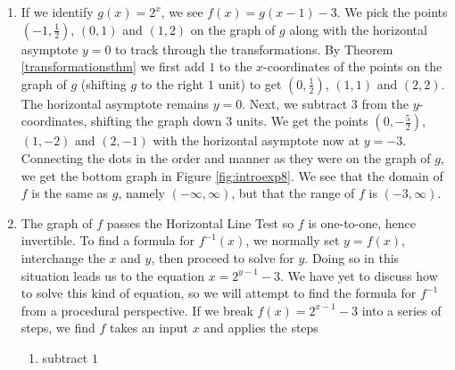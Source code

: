 {
\begin{enumerate}

\item  If we identify $g(x) = 2^{x}$, we see $f(x) = g(x-1)-3$.  We pick the points $\left(-1, \frac{1}{2}\right)$, $(0,1)$ and $(1, 2)$ on the graph of $g$ along with the horizontal asymptote $y=0$ to track through the transformations. By Theorem \ref{transformationsthm} we first add $1$ to the $x$-coordinates of the points on the graph of $g$ (shifting $g$ to the right $1$ unit) to get $\left(0, \frac{1}{2}\right)$, $(1,1)$ and $(2, 2)$.  The horizontal asymptote remains $y=0$.  Next, we subtract $3$ from the $y$-coordinates, shifting the graph down $3$ units.  We get the points $\left(0, -\frac{5}{2}\right)$, $(1,-2)$ and $(2, -1)$ with the horizontal asymptote now at $y=-3$.  Connecting the dots in the order and manner as they were on the graph of $g$, we get the bottom graph in Figure \ref{fig:introexp8}.  We see that the domain of $f$ is the same as $g$, namely $(-\infty, \infty)$, but that the range of $f$ is $(-3, \infty)$.



\item  The graph of $f$ passes the Horizontal Line Test so $f$ is one-to-one, hence invertible.  To find a formula for $f^{-1}(x)$, we normally set $y=f(x)$, interchange the $x$ and $y$, then proceed to solve for $y$.  Doing so in this situation leads us to the equation $x = 2^{y-1}-3$.  We have yet to discuss how to solve this kind of equation, so we will attempt to find the formula for $f^{-1}$ from a procedural perspective.  If we break $f(x) = 2^{x-1}-3$ into a series of steps, we find $f$ takes an input $x$ and applies the steps

\drawexampleline

\begin{enumerate}

\item subtract $1$


\end{enumerate}
\end{enumerate}}
